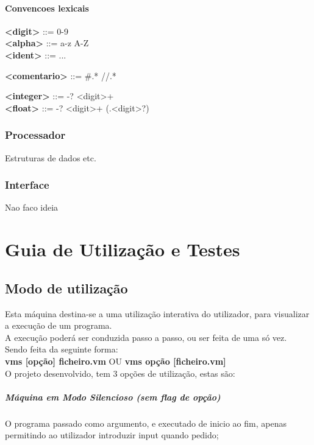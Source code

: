 \documentclass{report}
\begin{document}
\subsubsection{Convencoes lexicais}

\null\quad \textbf{\textless digit\textgreater}  ::= 0-9\\
\null\quad \textbf{\textless alpha\textgreater} ::= a-z \textvertline\space A-Z\\
\null\quad \textbf{\textless ident\textgreater} ::= ...

\null\quad \textbf{\textless comentario\textgreater} ::= \#.* \textvertline \space //\textspace\space.*

\null\quad \textbf{\textless integer\textgreater} ::= -? \textless digit\textgreater + \\
\null\quad \textbf{\textless float\textgreater} ::= -? \textless digit\textgreater + (.\textless digit\textgreater *?)\\

\subsection{Processador}
\quad Estruturas de dados etc.
\subsection{Interface}
\quad Nao faco ideia

\chapter{Guia de Utilização e Testes}
\section{Modo de utilização}
\quad Esta máquina destina-se a uma utilização interativa do utilizador, para visualizar a execução de um programa.\\
A execução poderá ser conduzida passo a passo, ou ser feita de uma só vez.\\
Sendo feita da seguinte forma:\\

\quad \textbf{vms [opção] ficheiro.vm} OU \textbf{vms opção [ficheiro.vm]}\\

O projeto desenvolvido, tem 3 opções de utilização, estas são:
\paragraph{\quad Máquina em Modo Silencioso (sem flag de opção)}
	O programa passado como argumento, e executado de inicio ao fim, apenas permitindo ao utilizador introduzir input quando pedido;
\end{document}
